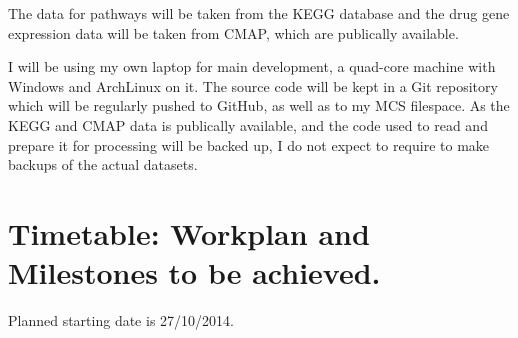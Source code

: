\documentclass[12pt,a4]{article}
\begin{document}
The data for pathways will be taken from the KEGG\cite{KEGG} database and the drug gene expression data will be taken from CMAP\cite{CMap}, which are publically available.

I will be using my own laptop for main development, a quad-core machine with Windows and ArchLinux on it. The source code will be kept in a Git repository which will be regularly pushed to GitHub, as well as to my MCS filespace. As the KEGG and CMAP data is publically available, and the code used to read and prepare it for processing will be backed up, I do not expect to require to make backups of the actual datasets.

\section*{Timetable: Workplan and Milestones to be achieved.}

Planned starting date is 27/10/2014.
\end{document}
